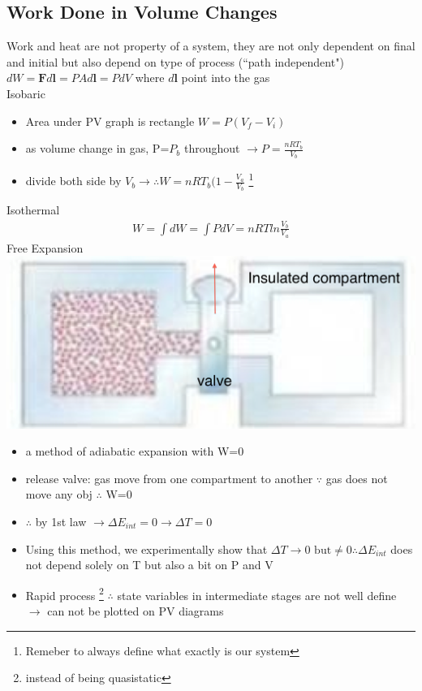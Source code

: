 \documentclass[12 pt , twoside, letterpaper] {article}
\renewcommand{\vec}[1]{\mathbf{#1}}
\begin{document}
		\subsection{Work Done in Volume Changes}
		Work and heat are not property of a system, they are not only dependent on final and initial but also depend on type of process (``path independent")
		$dW=\vec{F} d\vec{l}= PA d\vec{l}= PdV$ where $d\vec{l}$ point into the gas
\\		Isobaric
			\begin{itemize}
				\item Area under PV graph is rectangle $W=P(V_f-V_i)$
				\item as volume change in gas, P=$P_b$ throughout $\rightarrow P=\frac{nRT_b}{V_b}$
				\item divide both side by $V_b \rightarrow \therefore W= nRT_b(1-\frac{V_a}{V_b}$
				\footnote{Remeber to always define what exactly is our system}
			\end{itemize}
		Isothermal
			\begin{align}
				W= \int dW=\int PdV= nRT ln \frac{V_b}{V_a}
			\end{align}
			Free Expansion
			\\ \includegraphics[scale=0.2]{FreeExpansion}
			\begin{itemize}
				\item a method of adiabatic expansion with W=0
				\item release valve: gas move from one compartment to another 
							$\because$ gas does not move any obj $\therefore$ W=0
				\item $\therefore$ by 1st law $\rightarrow \Delta E_{int} =0 \rightarrow \Delta T=0$
				\item Using this method, we experimentally show that $\Delta T \rightarrow 0 \text{ but} \neq 0 \therefore \Delta E_{int}$ does not depend solely on T but also a bit on P and V
				\item Rapid process \footnote{instead of being quasistatic} $\therefore$ state variables in intermediate stages are not well define $\rightarrow$ can not be plotted on PV diagrams 
			\end{itemize}
\end{document}
